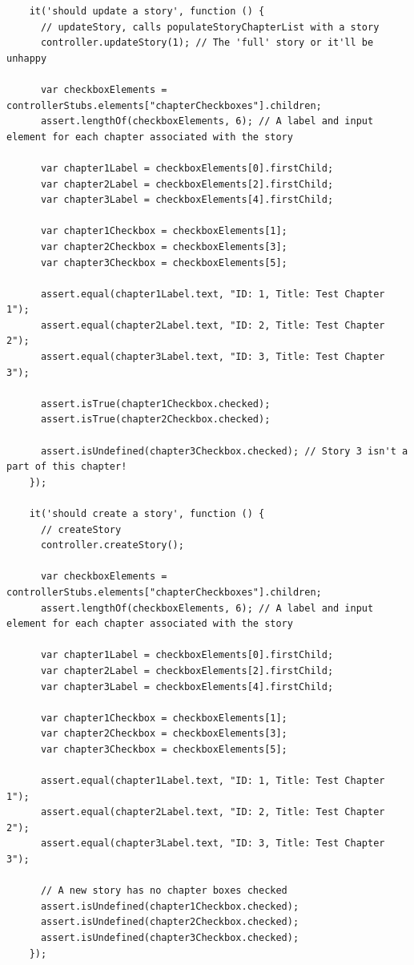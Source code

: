 \documentclass[12pt]{ucthesis}
\begin{document}
\begin{lstlisting}
    it('should update a story', function () {
      // updateStory, calls populateStoryChapterList with a story
      controller.updateStory(1); // The 'full' story or it'll be unhappy

      var checkboxElements = controllerStubs.elements["chapterCheckboxes"].children;
      assert.lengthOf(checkboxElements, 6); // A label and input element for each chapter associated with the story

      var chapter1Label = checkboxElements[0].firstChild;
      var chapter2Label = checkboxElements[2].firstChild;
      var chapter3Label = checkboxElements[4].firstChild;

      var chapter1Checkbox = checkboxElements[1];
      var chapter2Checkbox = checkboxElements[3];
      var chapter3Checkbox = checkboxElements[5];

      assert.equal(chapter1Label.text, "ID: 1, Title: Test Chapter 1");
      assert.equal(chapter2Label.text, "ID: 2, Title: Test Chapter 2");
      assert.equal(chapter3Label.text, "ID: 3, Title: Test Chapter 3");
      
      assert.isTrue(chapter1Checkbox.checked);
      assert.isTrue(chapter2Checkbox.checked);

      assert.isUndefined(chapter3Checkbox.checked); // Story 3 isn't a part of this chapter!
    });

    it('should create a story', function () {
      // createStory
      controller.createStory();

      var checkboxElements = controllerStubs.elements["chapterCheckboxes"].children;
      assert.lengthOf(checkboxElements, 6); // A label and input element for each chapter associated with the story

      var chapter1Label = checkboxElements[0].firstChild;
      var chapter2Label = checkboxElements[2].firstChild;
      var chapter3Label = checkboxElements[4].firstChild;

      var chapter1Checkbox = checkboxElements[1];
      var chapter2Checkbox = checkboxElements[3];
      var chapter3Checkbox = checkboxElements[5];

      assert.equal(chapter1Label.text, "ID: 1, Title: Test Chapter 1");
      assert.equal(chapter2Label.text, "ID: 2, Title: Test Chapter 2");
      assert.equal(chapter3Label.text, "ID: 3, Title: Test Chapter 3");
      
      // A new story has no chapter boxes checked
      assert.isUndefined(chapter1Checkbox.checked);
      assert.isUndefined(chapter2Checkbox.checked);
      assert.isUndefined(chapter3Checkbox.checked);
    });


\end{lstlisting}
\end{document}
